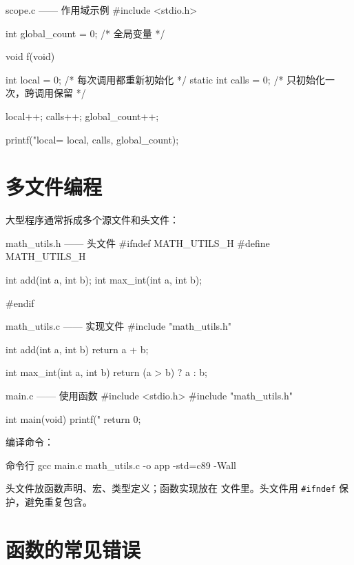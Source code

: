 \begin{codebox}{scope.c —— 作用域示例}
#include <stdio.h>

int global_count = 0;       /* 全局变量 */

void f(void)
{
    int local = 0;          /* 每次调用都重新初始化 */
    static int calls = 0;   /* 只初始化一次，跨调用保留 */

    local++;
    calls++;
    global_count++;

    printf("local=%
           local, calls, global_count);
}
\end{codebox}

\section{多文件编程}

大型程序通常拆成多个源文件和头文件：

\begin{codebox}{math\_utils.h —— 头文件}
#ifndef MATH_UTILS_H
#define MATH_UTILS_H

int add(int a, int b);
int max_int(int a, int b);

#endif
\end{codebox}

\begin{codebox}{math\_utils.c —— 实现文件}
#include "math_utils.h"

int add(int a, int b)
{
    return a + b;
}

int max_int(int a, int b)
{
    return (a > b) ? a : b;
}
\end{codebox}

\begin{codebox}{main.c —— 使用函数}
#include <stdio.h>
#include "math_utils.h"

int main(void)
{
    printf("%
    return 0;
}
\end{codebox}

编译命令：

\begin{outbox}{命令行}
gcc main.c math_utils.c -o app -std=c89 -Wall
\end{outbox}

\begin{tipbox}[头文件里只放声明]
头文件放函数声明、宏、类型定义；函数实现放在  文件里。头文件用 \texttt{\#ifndef} 保护，避免重复包含。
\end{tipbox}

\section{函数的常见错误}

